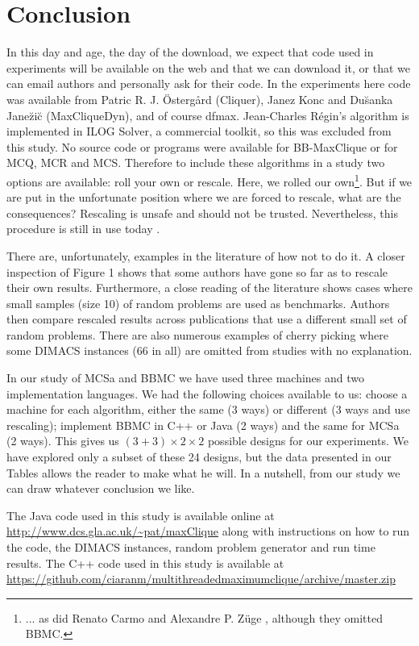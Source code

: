 \documentclass[runningheads]{llncs}
\begin{document}
\section{Conclusion}
\vspace{-1.5mm}
In this day and age, the day of the download, we expect that code used in experiments will be available on the web
and that we can download it, or that we can email authors and personally ask for their code. In the experiments here code was available 
from Patric R. J. \"{O}sterg\aa{}rd (Cliquer), Janez Konc and Du\u{s}anka Jane\u{z}i\u{c} (MaxCliqueDyn), and of course dfmax.
Jean-Charles R\'{e}gin's algorithm is implemented in ILOG Solver, a commercial toolkit, so this was excluded from this study. 
No source code or programs were available for BB-MaxClique or for MCQ, MCR and MCS. Therefore to include
these algorithms in a study two options are available: roll your own or rescale. Here, we rolled our own\footnote{... as did Renato Carmo and
Alexandre P. Z{\"u}ge \cite{carmoZuge}, although they omitted BBMC.}.
But if we are put in the unfortunate position where we are forced to rescale, what are the consequences?
Rescaling is unsafe and should not be trusted.  Nevertheless, this procedure is still in use today \cite{MCMD14}.

There are, unfortunately, examples in the literature of how not to do it. A closer inspection of Figure 1 shows
that some authors have gone so far as to rescale their own results. Furthermore, a close reading of the literature
shows cases where small samples (size 10) of random problems are used as benchmarks. 
Authors then compare rescaled results across publications that use a different small set of random problems.
There are also numerous examples of cherry picking where some DIMACS instances (66 in all) are omitted from studies with no explanation.

In our study of MCSa and BBMC we have used three machines and two implementation languages. We had the following 
choices available to us: choose a machine for each algorithm, either the same (3 ways) or different (3 ways and use rescaling);
implement BBMC in C++ or Java (2 ways) and the same for MCSa (2 ways). This gives us $(3+3) \times 2 \times 2$ possible 
designs for our experiments. We have explored only a subset of these 24 designs, but the data presented in our Tables allows the reader 
to make what he will. In a nutshell, from our study we can draw whatever conclusion we like.

The Java code used in this study is available online at \url{http://www.dcs.gla.ac.uk/~pat/maxClique} along with instructions on how to 
run the code, the DIMACS instances, random problem generator and run time results. 
The C++ code used in this study is available at \url{https://github.com/ciaranm/multithreadedmaximumclique/archive/master.zip}
\vspace{-2mm}
\end{document}
